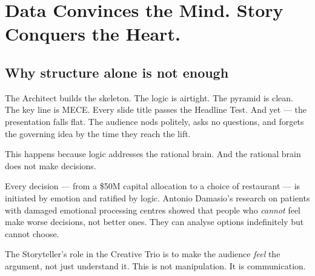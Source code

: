 
\section{Data Convinces the Mind. Story Conquers the Heart.}



\subsection{Why structure alone is not enough}

The Architect builds the skeleton. The logic is airtight. The pyramid is clean. The key line is MECE. Every slide title passes the Headline Test. And yet --- the presentation falls flat. The audience nods politely, asks no questions, and forgets the governing idea by the time they reach the lift.

This happens because logic addresses the rational brain. And the rational brain does not make decisions.

Every decision --- from a \$50M capital allocation to a choice of restaurant --- is initiated by emotion and ratified by logic. Antonio Damasio's research on patients with damaged emotional processing centres showed that people who \emph{cannot} feel make worse decisions, not better ones. They can analyse options indefinitely but cannot choose.

The Storyteller's role in the Creative Trio is to make the audience \emph{feel} the argument, not just understand it. This is not manipulation. It is communication.

